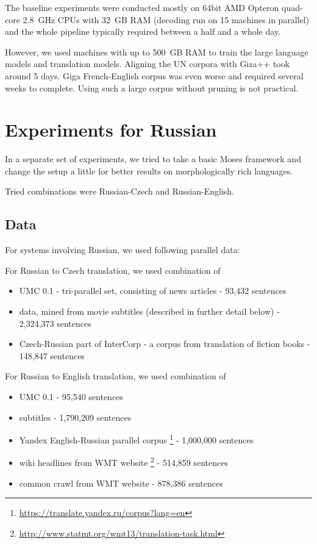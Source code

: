 \documentclass[11pt,letterpaper]{article}
\def\parcite#1{\cite{#1}}  %
\def\parcite#1{\cite{#1}}
\begin{document}
The baseline experiments were conducted mostly on 64bit AMD Opteron quad-core 2.8~GHz CPUs with 32~GB RAM
(decoding run on 15 machines in parallel)
and the whole pipeline typically required between a half and a whole day.

However, we used machines with up to 500~GB RAM to train the large language models and translation models.
Aligning the UN corpora with Giza++ took around 5 days.
Giga French-English corpus was even worse and required several weeks to complete.
Using such a large corpus without pruning is not practical.

\section{Experiments for Russian}
In a separate set of experiments, we tried to take a basic Moses framework and change the setup a little for better results on morphologically rich languages.

Tried combinations were Russian-Czech and Russian-English.

\subsection{Data}
For systems involving Russian, we used following parallel data:

For Russian to Czech translation, we used combination of
\begin{itemize}
\item UMC 0.1 \parcite{umc} - tri-parallel set, consisting of news articles  - 93,432 sentences
\item data, mined from movie subtitles (described in further detail below) - 2,324,373 sentences
\item Czech-Russian part of InterCorp - a corpus from translation of fiction books \parcite{cermak:rosen:10} - 148,847 sentences
\end{itemize}
For Russian to English translation, we used combination of
\begin{itemize}
\item UMC 0.1 - 95,540 sentences
\item subtitles - 1,790,209 sentences
\item Yandex English-Russian parallel corpus \footnote{\url{https://translate.yandex.ru/corpus?lang=en}} - 1,000,000 sentences
\item wiki headlines from WMT website \footnote{\url{http://www.statmt.org/wmt13/translation-task.html}} - 514,859 sentences
\item common crawl from WMT website - 878,386 sentences

\end{itemize}
\end{document}

